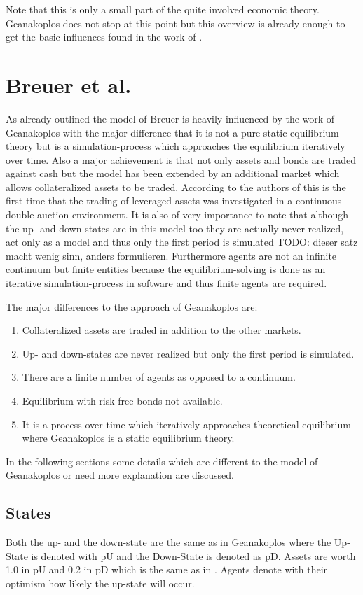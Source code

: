 \documentclass[../Bachelorarbeit.tex]{subfiles}
\begin{document}
\medskip

Note that this is only a small part of the quite involved economic theory. Geanakoplos does not stop at this point but this overview is already enough to get the basic influences found in the work of \cite{Breuer2015}.

\section{Breuer et al.}
As already outlined the model of Breuer is heavily influenced by the work of Geanakoplos with the major difference that it is not a pure static equilibrium theory but is a simulation-process which approaches the equilibrium iteratively over time. Also a major achievement is that not only assets and bonds are traded against cash but the model has been extended by an additional market which allows collateralized assets to be traded. According to the authors of \cite{Breuer2015} this is the first time that the trading of leveraged assets was investigated in a continuous double-auction environment. It is also of very importance to note that although the up- and down-states are in this model too they are actually never realized, act only as a model and thus only the first period is simulated TODO: dieser satz macht wenig sinn, anders formulieren. Furthermore agents are not an infinite continuum but finite entities because the equilibrium-solving is done as an iterative simulation-process in software and thus finite agents are required.

The major differences to the approach of Geanakoplos are:
\begin{enumerate}
\item Collateralized assets are traded in addition to the other markets.
\item Up- and down-states are never realized but only the first period is simulated.
\item There are a finite number of agents as opposed to a continuum.
\item Equilibrium with risk-free bonds not available.
\item It is a process over time which iteratively approaches theoretical equilibrium where Geanakoplos is a static equilibrium theory.
\end{enumerate}

In the following sections some details which are different to the model of Geanakoplos or need more explanation are discussed.

\subsection{States}
Both the up- and the down-state are the same as in Geanakoplos where the Up-State is denoted with pU and the Down-State is denoted as pD. Assets are worth 1.0 in pU and 0.2 in pD which is the same as in \cite{Geanakoplos2009}. Agents denote with their optimism how likely the up-state will occur.
\end{document}
